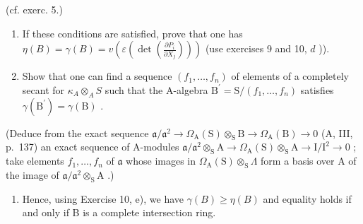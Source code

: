 (cf. exerc. 5.)

\begin{enumerate}
\def\labelenumi{\alph{enumi})}
\setcounter{enumi}{2}
\item
  If these conditions are satisfied, prove that one has \(\eta(B) = \gamma(B) = v(\varepsilon(\det(\frac{\partial P_i}{\partial X_j})))\) (use exercises 9 and 10, \(d\) )).
\item
  Show that one can find a sequence \((f_{1},\ldots,f_{n})\) of elements of a completely secant for \(\kappa_{A}\otimes_{A}S\) such that the A-algebra \(\mathrm{B}^{\prime}=\mathrm{S}/(f_{1},\ldots,f_{n})\) satisfies \(\gamma(\mathrm{B}^{\prime})=\gamma(\mathrm{B})\) .
\end{enumerate}

(Deduce from the exact sequence \(\mathfrak{a}/\mathfrak{a}^{2}\to\Omega_{\mathrm{A}}(\mathrm{S})\otimes_{\mathrm{S}}\mathrm{B}\to\Omega_{\mathrm{A}}(\mathrm{B})\to0\) (A, III, p.~137) an exact sequence of A-modules \(\mathfrak{a}/\mathfrak{a}^{2}\otimes_{\mathrm{S}}\mathrm{A}\to\Omega_{\mathrm{A}}(\mathrm{S})\otimes_{\mathrm{S}}\mathrm{A}\to\mathrm{I}/\mathrm{I}^{2}\to0\) ; take elements \(f_{1},\ldots,f_{n}\) of \(\mathfrak{a}\) whose images in \(\Omega_{\mathrm{A}}(\mathrm{S})\otimes_{\mathrm{S}}\Lambda\) form a basis over A of the image of \(\mathfrak{a}/\mathfrak{a}^{2}\otimes_{\mathrm{S}}\mathrm{A}\) .)

\begin{enumerate}
\def\labelenumi{\alph{enumi})}
\setcounter{enumi}{4}
\tightlist
\item
  Hence, using Exercise 10, e), we have \(\gamma(B) \geqslant \eta(B)\) and equality holds if and only if B is a complete intersection ring.
\end{enumerate}

